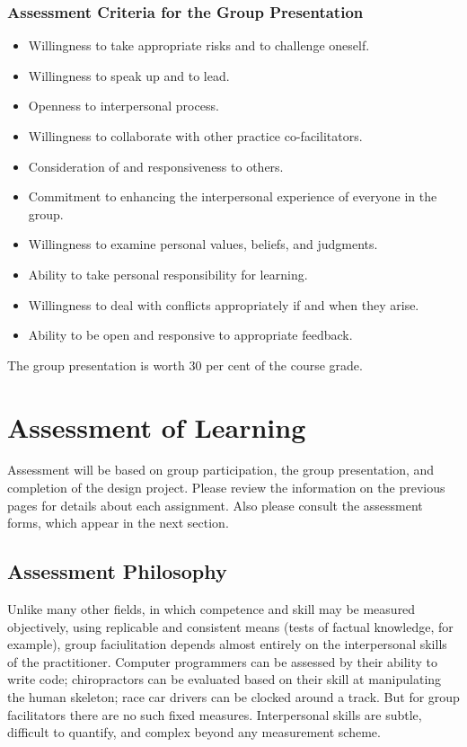\documentclass[letterpaper,10pt,headsepline]{scrreprt}
\begin{document}
\subsubsection{Assessment Criteria for the Group Presentation}
\begin{itemize}
\item Willingness to take appropriate risks and to challenge oneself.
\item Willingness to speak up and to lead.
\item Openness to interpersonal process.
\item Willingness to collaborate with other practice co-facilitators.
\item Consideration of and responsiveness to others.
\item Commitment to enhancing the interpersonal experience of everyone in the group.
\item Willingness to examine personal values, beliefs, and judgments.
\item Ability to take personal responsibility for learning.
\item Willingness to deal with conflicts appropriately if and when they arise.
\item Ability to be open and responsive to appropriate feedback.
 
\end{itemize}

The group presentation is worth 30 per cent of the course grade.

\section{Assessment of Learning}
Assessment will be based on group participation, the group
presentation, and completion of the design project. Please review the
information on the previous pages for details about each assignment.
Also please consult the assessment forms, which appear in the next
section.

\subsection{Assessment Philosophy}
Unlike many other fields, in which competence and skill may be measured objectively, using replicable and consistent means (tests of factual knowledge, for example), group faciulitation depends almost entirely on the interpersonal skills of the practitioner. Computer programmers can be assessed by their ability to write code; chiropractors can be evaluated based on their skill at manipulating the human skeleton; race car drivers can be clocked around a track. But for group facilitators there are no such fixed measures. Interpersonal skills are subtle, difficult to quantify, and complex beyond any measurement scheme.
\end{document}
